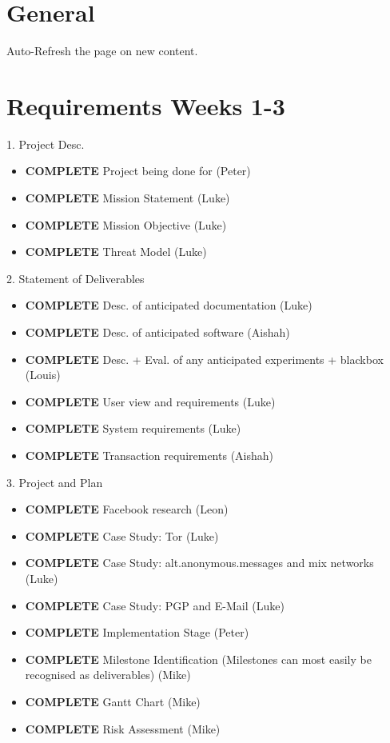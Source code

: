 \section{General}
Auto-Refresh the page on new content.

\section{Requirements \textbf{Weeks 1-3}}
1. Project Desc.
\begin{itemize}
\item \textbf{COMPLETE} Project being done for (Peter)
\item \textbf{COMPLETE} Mission Statement (Luke)
\item \textbf{COMPLETE} Mission Objective (Luke)
\item \textbf{COMPLETE} Threat Model (Luke)
\end{itemize}

2. Statement of Deliverables
\begin{itemize}
\item \textbf{COMPLETE}    Desc. of anticipated documentation (Luke)
\item \textbf{COMPLETE}    Desc. of anticipated software (Aishah)
\item \textbf{COMPLETE}    Desc. + Eval. of any anticipated experiments + blackbox (Louis)
\item \textbf{COMPLETE}    User view and requirements (Luke)
\item \textbf{COMPLETE}    System requirements (Luke)
\item \textbf{COMPLETE}    Transaction requirements (Aishah)
\end{itemize}

3. Project and Plan
\begin{itemize}
\item \textbf{COMPLETE}    Facebook research (Leon)
\item \textbf{COMPLETE}    Case Study: Tor (Luke)
\item \textbf{COMPLETE}    Case Study: alt.anonymous.messages and mix networks (Luke)
\item \textbf{COMPLETE}    Case Study: PGP and E-Mail (Luke)
\item \textbf{COMPLETE}    Implementation Stage (Peter)
\item \textbf{COMPLETE}    Milestone Identification (Milestones can most easily be recognised as deliverables) (Mike)
\item \textbf{COMPLETE}    Gantt Chart (Mike)
\item \textbf{COMPLETE}    Risk Assessment (Mike)
\end{itemize}

